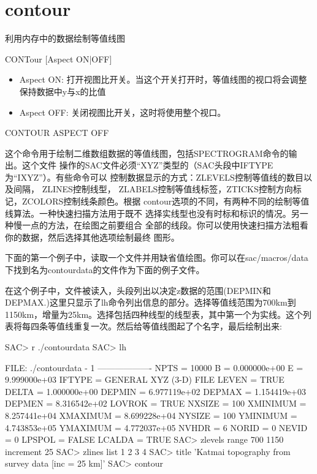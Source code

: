 \section{contour}
\label{cmd:contour}

利用内存中的数据绘制等值线图

CONTour [Aspect ON|OFF]

\begin{itemize}
\item Aspect ON: 打开视图比开关。当这个开关打开时，等值线图的视口将会调整保持数据中y与x的比值
\item Aspect OFF: 关闭视图比开关，这时将使用整个视口。
\end{itemize}

CONTOUR  ASPECT  OFF

这个命令用于绘制二维数组数据的等值线图，包括SPECTROGRAM命令的输出。这个文件
操作的SAC文件必须``XYZ''类型的（SAC头段中IFTYPE为``IXYZ''）。有些命令可以
控制数据显示的方式：ZLEVELS控制等值线的数目以及间隔， ZLINES控制线型，
ZLABELS控制等值线标签，ZTICKS控制方向标记，ZCOLORS控制线条颜色。根据
contour选项的不同，有两种不同的绘制等值线算法。一种快速扫描方法用于既不
选择实线型也没有时标和标识的情况。另一种慢一点的方法，在绘图之前要组合
全部的线段。你可以使用快速扫描方法粗看你的数据，然后选择其他选项绘制最终
图形。

下面的第一个例子中，读取一个文件并用缺省值绘图。你可以在sac/macros/data下找到名为contourdata的文件作为下面的例子文件。

在这个例子中，文件被读入，头段列出以决定z数据的范围(DEPMIN和DEPMAX.)这里只显示了lh命令列出信息的部分。选择等值线范围为700km到1150km，增量为25km。选择包括四种线型的线型表，其中第一个为实线。这个列表将每四条等值线重复一次。然后给等值线图起了个名字，最后绘制出来:
\begin{SACCode}
SAC> r ./contourdata 
SAC> lh
  
  FILE: ./contourdata - 1
 -------------------
         NPTS = 10000
            B = 0.000000e+00
            E = 9.999000e+03
       IFTYPE = GENERAL XYZ (3-D) FILE
        LEVEN = TRUE
        DELTA = 1.000000e+00
       DEPMIN = 6.977119e+02
       DEPMAX = 1.154419e+03
       DEPMEN = 8.316542e+02
       LOVROK = TRUE
       NXSIZE = 100
     XMINIMUM = 8.257441e+04
     XMAXIMUM = 8.699228e+04
       NYSIZE = 100
     YMINIMUM = 4.743853e+05
     YMAXIMUM = 4.772037e+05
        NVHDR = 6
        NORID = 0
        NEVID = 0
       LPSPOL = FALSE
       LCALDA = TRUE
SAC> zlevels range 700 1150 increment 25
SAC> zlines list 1 2 3 4
SAC> title 'Katmai topography from survey data [inc = 25 km]'
SAC> contour
\end{SACCode}

